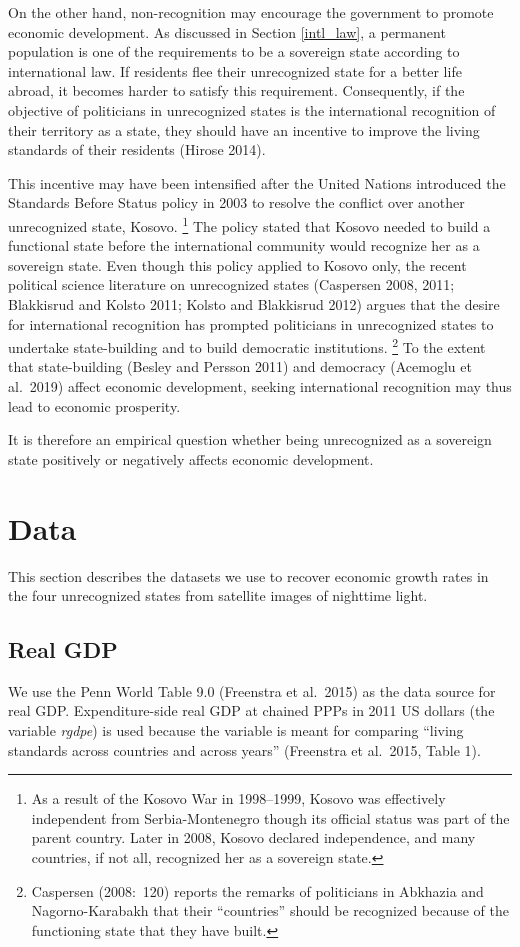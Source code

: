 \documentclass[12pt,a4paper]{article}%
\begin{document}
On the other hand, non-recognition may encourage the government to promote economic development. 
As discussed in Section \ref{intl_law}, a permanent population is one of the requirements to be a sovereign state according to international law.
If residents flee their unrecognized state for a better life abroad, it becomes harder to satisfy this requirement.
Consequently, if the objective of politicians in unrecognized states is the international recognition of their territory as a state, they should have an incentive to improve the living standards of their residents (Hirose 2014). 

This incentive may have been intensified after the United Nations introduced the Standards Before Status policy in 2003 to resolve the conflict over another unrecognized state, Kosovo.%
\footnote{
	As a result of the Kosovo War in 1998--1999, Kosovo was effectively independent from Serbia-Montenegro though its official status was part of the parent country.
	Later in 2008, Kosovo declared independence, and many countries, if not all, recognized her as a sovereign state. 
} 
The policy stated that Kosovo needed to build a functional state before the international community would recognize her as a sovereign state.
Even though this policy applied to Kosovo only, the recent political science literature on unrecognized states (Caspersen 2008, 2011; Blakkisrud and Kolsto 2011; Kolsto and Blakkisrud 2012) argues that the desire for international recognition has prompted politicians in unrecognized states to undertake state-building and to build democratic institutions.%
\footnote{
	Caspersen (2008:\ 120) reports the remarks of politicians in Abkhazia and Nagorno-Karabakh that their ``countries'' should be recognized because of the functioning state that they have built.
	}
To the extent that state-building (Besley and Persson 2011) and democracy (Acemoglu et al.\ 2019) affect economic development, seeking international recognition may thus lead to economic prosperity.

It is therefore an empirical question whether being unrecognized as a sovereign state positively or negatively affects economic development.	

\section{Data}\label{data}
This section describes the datasets we use to recover economic growth rates in the four unrecognized states from satellite images of nighttime light.
\subsection{Real GDP}
We use the Penn World Table 9.0 (Freenstra et al.\ 2015) as the data source for real GDP. 
Expenditure-side real GDP at chained PPPs in 2011 US dollars (the variable \textit{rgdpe}) is used because the variable is meant for comparing ``living standards across countries and across years'' (Freenstra et al.\ 2015, Table 1).
\end{document}
